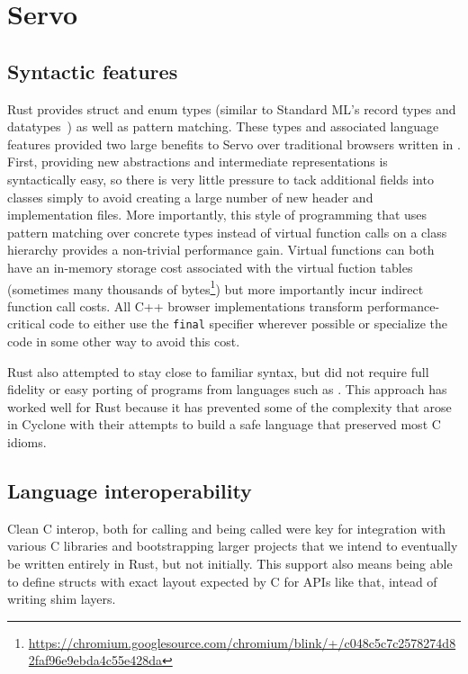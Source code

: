 \section{Servo}

\subsection{Syntactic features}

Rust provides struct and enum types (similar to Standard ML's record types and datatypes~\cite{sml97-definition}) as
well as pattern matching.
These types and associated language features provided two large benefits to Servo over traditional browsers
written in \Cplusplus{}.
First, providing new abstractions and intermediate representations is syntactically easy, so there is very little
pressure to tack additional fields into classes simply to avoid creating a large number of new header and implementation
files.
More importantly, this style of programming that uses pattern matching over concrete types instead of
virtual function calls on a class hierarchy provides a non-trivial performance gain.
Virtual functions can both have an in-memory storage cost associated with the virtual fuction tables (sometimes many thousands of bytes\footnote{\url{https://chromium.googlesource.com/chromium/blink/+/c048c5c7c2578274d82faf96e9ebda4c55e428da}}) but more importantly
incur indirect function call costs.
All C++ browser implementations transform performance-critical code to either use the \lstinline[language=C]{final}
specifier wherever possible or specialize the code in some other way to avoid this cost.

Rust also attempted to stay close to familiar syntax, but did not require full fidelity or easy porting of
programs from languages such as \Cplusplus.
This approach has worked well for Rust because it has prevented some of the complexity that arose in Cyclone
with their attempts to build a safe language that preserved most C idioms.

\subsection{Language interoperability}
Clean C interop, both for calling and being called were key for integration with various C libraries and bootstrapping larger projects that we intend to eventually be written entirely in Rust, but not initially. This support also means being able to define structs with exact layout expected by C for APIs like that, intead of writing shim layers.

